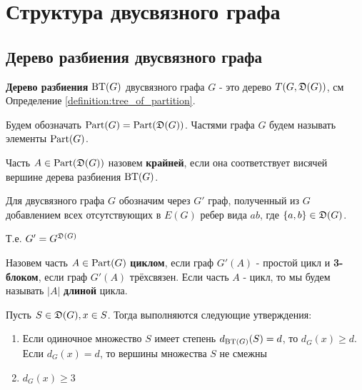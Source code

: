 
\section{Структура двусвязного графа}

\subsection{Дерево разбиения двусвязного графа}


\begin{df}
	\textbf{Дерево разбиения} $\operatorname{BT}(G)$ двусвязного графа  $G$ - это дерево  $T(G, \mathfrak{D}(G))$, см Определение \ref{definition:tree_of_partition}.

	Будем обозначать $\operatorname{Part}(G) = \operatorname{Part}(\mathfrak{D}(G))$.
	Частями графа  $G$ будем называть элементы  $\operatorname{Part}(G)$.
\end{df}

\begin{df}
	Часть $A \in \operatorname{Part}(\mathfrak{D}(G))$ назовем \textbf{крайней}, если она соответствует висячей вершине дерева разбиения  $\operatorname{BT}(G)$.
\end{df}

\begin{df}[G']
	Для двусвязного графа $G$ обозначим через $G'$ граф, полученный из $G$ добавлением всех отсутствующих в $E(G)$ ребер вида $ab$, где $\{a, b\} \in \mathfrak{D}(G)$.

	Т.е. $G' = G^{\mathfrak{D}(G)}$
\end{df}

\begin{df}
	Назовем часть $A \in \operatorname{Part}(G)$ \textbf{циклом}, если граф $G'(A)$ - простой цикл и \textbf{3-блоком}, если граф $G'(A)$ трёхсвязен.
	Если часть $A$ - цикл, то мы будем называть $|A|$ \textbf{длиной} цикла.
\end{df}

\begin{lm}[Лемма 2.1] \label{lemma:2_1}
	Пусть $S \in \mathfrak{D}(G), x \in S$.
	Тогда выполняются следующие утверждения:
	 \begin{enumerate}
	\item Если одиночное множество $S$ имеет степень  $d_{\operatorname{BT}(G)}(S) = d$, то  $d_G(x) \geqslant d$.
		 Если  $d_G(x) = d$, то вершины множества  $S$ не смежны
	 \item $d_G(x) \geqslant 3$
	\end{enumerate}
\end{lm}

